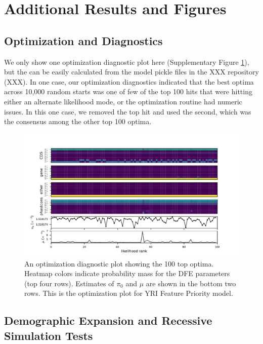 \documentclass[11pt]{article}
\begin{document}
\section{Additional Results and Figures}

\subsection{Optimization and Diagnostics}
\label{supp:optim}

We only show one optimization diagnostic plot here (Supplementary Figure
\ref{suppfig:diag-plot}), but the can be easily calculated from the model
pickle files in the XXX repository (XXX). In one case, our optimization
diagnostics indicated that the best optima across 10,000 random starts was one
of few of the top 100 hits that were hitting either an alternate likelihood
mode, or the optimization routine had numeric issues. In this one case, we
removed the top hit and used the second, which was the consensus among the
other top 100 optima. 

\begin{figure}[htbp]
  \label{suppfig:diag-plot}
  \centering
  \includegraphics[width=\textwidth]{figures/supplementary/figure_feature_priority_yri_full_diag.pdf}

  \caption{ An optimization diagnostic plot showing the 100 top optima. Heatmap
  colors indicate probability mass for the DFE parameters (top four rows).
Estimates of $\pi_0$ and $\mu$ are shown in the bottom two rows. This is the
optimization plot for YRI Feature Priority model.}
\end{figure}


\subsection{Demographic Expansion and Recessive Simulation Tests}
\end{document}
